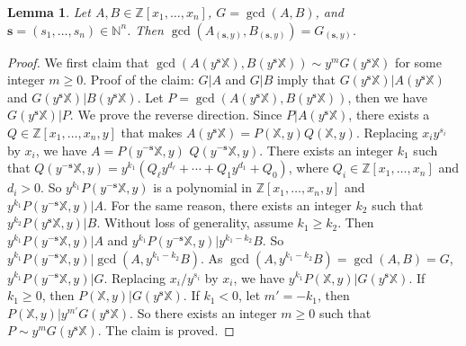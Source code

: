 \documentclass[final,20pt]{elsarticle}
\newtheorem{lemma}[theorem]{Lemma}
\def\N{{\mathbb N}}
\def\Z{{\mathbb Z}}
\def\X{{\mathbb{X}}}
\begin{document}
\begin{lemma}\label{the-5}
Let $A,B\in \Z[x_1,\dots,x_n]$, $G=\gcd(A,B)$, and $\mathbf{s}=(s_1,\dots,s_n)\in \N^n$.
Then $\gcd(A_{(\mathbf{s},y)},B_{(\mathbf{s},y)})= G_{(\mathbf{s},y)}$.
\end{lemma}
\begin{proof}
We first claim that $\gcd(A(y^\mathbf{s}\X),B(y^\mathbf{s}\X))\sim y^mG(y^\mathbf{s}\X)$ for some integer $m\geq 0.$
%
Proof of the claim:
%
%
$G|A$ and $G|B$ imply that $G(y^\mathbf{s}\X)|A(y^\mathbf{s}\X)$ and $G(y^\mathbf{s}\X)|B(y^\mathbf{s}\X)$. Let $P=\gcd(A(y^\mathbf{s}\X),B(y^\mathbf{s}\X))$, then we have $G(y^\mathbf{s}\X)|P$.
%
We prove the reverse direction. Since $P|A(y^\mathbf{s}\X)$,
there exists a $Q\in\Z[x_1,\dots,x_n,y]$ that makes $A(y^\mathbf{s}\X)=P(\X, y)Q(\X,y)$. Replacing $x_iy^{s_i}$ by $x_i$, we have
$A=P(y^{-\mathbf{s}}\X,y)$ $Q(y^{-\mathbf{s}}\X,y)$. There exists an integer $k_1$ such that $Q(y^{-\mathbf{s}}\X,y)=y^{k_1}(Q_{\ell}y^{d_{\ell}}+\cdots+Q_1y^{d_1}+Q_0)$, where $Q_i\in \Z[x_1,\dots,x_n]$ and $d_i>0$. So $y^{k_1}P(y^{-\mathbf{s}}\X,y)$ is a polynomial in $\Z[x_1,\dots,x_n,y]$ and $y^{k_1}P(y^{-\mathbf{s}}\X,y)|A$.
%
For the same reason, there exists an integer $k_2$ such that $y^{k_2}P(y^{\mathbf{s}}\X,y)|B$.
%
Without loss of generality, assume $k_1\geq k_2$. Then $y^{k_1}P(y^{-\mathbf{s}}\X,y)|A$ and $y^{k_1}P(y^{-\mathbf{s}}\X,y)|y^{k_1-k_2}B$.
%
So $y^{k_1}P(y^{-\mathbf{s}}\X,y)|\gcd(A,y^{k_1-k_2}B)$.
%
As $\gcd(A,y^{k_1-k_2}B)=\gcd(A,B)=G$,
$y^{k_1}P(y^{-\mathbf{s}}\X,y)|G$. Replacing $x_i/y^{s_i}$ by $x_i$, we have $y^{k_1}P(\X,y)|G(y^{\mathbf{s}}\X)$.
If $k_1\geq 0$, then $P(\X,y)|G(y^{\mathbf{s}}\X)$.
If $k_1<0$, let $m'=-k_1$, then
$P(\X,y)|y^{m'}G(y^{\mathbf{s}}\X)$.
So there exists an integer $m\geq 0$ such that $P\sim y^{m}G(y^{\mathbf{s}}\X)$.
%
The claim is proved.


\end{proof}
\end{document}
